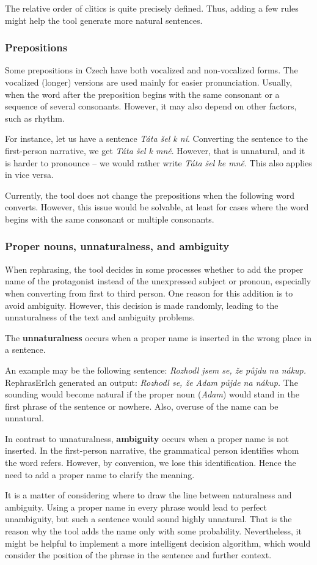 The relative order of clitics is quite precisely defined. Thus, adding a few rules might help the tool generate more natural sentences.


\subsubsection{Prepositions}

Some prepositions in Czech have both vocalized and non-vocalized forms. The vocalized (longer) versions are used mainly for easier pronunciation. Usually, when the word after the preposition begins with the same consonant or a sequence of several consonants. However, it may also depend on other factors, such as rhythm. \cite{vlasin-slovnik}

For instance, let us have a sentence \emph{Táta šel k ní}. Converting the sentence to the first-person narrative, we get \emph{Táta šel k mně}. However, that is unnatural, and it is harder to pronounce -- we would rather write \emph{Táta šel ke mně}. This also applies in vice versa.

Currently, the tool does not change the prepositions when the following word converts. However, this issue would be solvable, at least for cases where the word begins with the same consonant or multiple consonants.


\subsubsection{Proper nouns, unnaturalness, and ambiguity}

When rephrasing, the tool decides in some processes whether to add the proper name of the protagonist instead of the unexpressed subject or pronoun, especially when converting from first to third person. One reason for this addition is to avoid ambiguity. However, this decision is made randomly, leading to the unnaturalness of the text and ambiguity problems.

The \textbf{unnaturalness} occurs when a proper name is inserted in the wrong place in a sentence.

An example may be the following sentence: \emph{Rozhodl jsem se, že půjdu na nákup.} RephrasErIch generated an output: \emph{Rozhodl se, že Adam půjde na nákup.} The sounding would become natural if the proper noun (\emph{Adam}) would stand in the first phrase of the sentence or nowhere. Also, overuse of the name can be unnatural.

In contrast to unnaturalness, \textbf{ambiguity} occurs when a proper name is not inserted. In the first-person narrative, the grammatical person identifies whom the word refers. However, by conversion, we lose this identification. Hence the need to add a proper name to clarify the meaning.

It is a matter of considering where to draw the line between naturalness and ambiguity. Using a proper name in every phrase would lead to perfect unambiguity, but such a sentence would sound highly unnatural. That is the reason why the tool adds the name only with some probability. Nevertheless, it might be helpful to implement a more intelligent decision algorithm, which would consider the position of the phrase in the sentence and further context.


